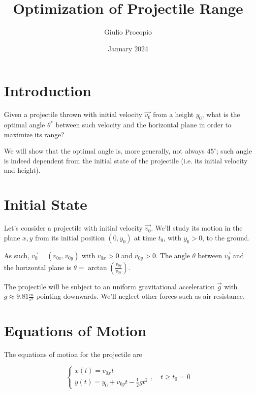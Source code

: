 \documentclass[a4paper,10pt]{article}
\begin{document}
\title{Optimization of Projectile Range}
\author{Giulio Procopio}
\date{January 2024}

\maketitle

\section{Introduction}

Given a projectile
thrown with initial velocity $\vec{v_0}$
from a height $y_0$,
what is the optimal angle $\theta^*$
between such velocity and the horizontal plane
in order to maximize its range?

We will show that the optimal angle is, more generally,
not always $45^\circ$;
such angle is indeed dependent
from the initial state of the projectile
(i.e. its initial velocity and height).

\section{Initial State}

Let's consider a projectile
with initial velocity $\vec{v_0}$.
We'll study its motion in the plane $x,y$
from its initial position $(0,y_0)$ at time $t_0$, with $y_0>0$,
to the ground.

As such, $\vec{v_0} = (v_{0x},v_{0y})$ with $v_{0x}>0$ and $v_{0y}>0$.
The angle $\theta$ between $\vec{v_0}$ and the horizontal plane is
$\theta = \arctan\left(\frac{v_{0y}}{v_{0x}}\right)$.

The projectile will be subject to an uniform gravitational acceleration
$\vec{g}$ with $g\approx9.81\frac{m}{s^2}$ pointing downwards.
We'll neglect other forces such as air resistance.

\section{Equations of Motion}

The equations of motion for the projectile are

\begin{equation}
    \begin{cases}
        x(t) = v_{0x}t\\
        y(t) = y_0 + v_{0y}t - \frac{1}{2}gt^2
    \end{cases}
    , \quad t\geq t_0 = 0
\end{equation}
\end{document}
